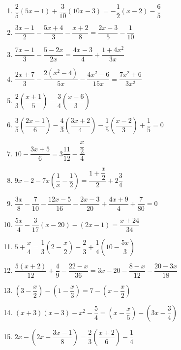 \documentclass{article}
\begin{document}
\begin{enumerate}[label=\bfseries\small 141.\arabic*, itemsep=4cm]
\item $\dfrac{2}{5}(5x-1) + \dfrac{3}{10}(10x-3) = -\dfrac{1}{2}(x-2) - \dfrac{6}{5}$

\item $\dfrac{3x-1}{2} - \dfrac{5x+4}{3} - \dfrac{x+2}{8} = \dfrac{2x-3}{5} - \dfrac{1}{10}$

\item $\dfrac{7x-1}{3} - \dfrac{5-2x}{2x} = \dfrac{4x-3}{4} + \dfrac{1+4x^2}{3x}$

\item $\dfrac{2x+7}{3} - \dfrac{2(x^2-4)}{5x} - \dfrac{4x^2-6}{15x} = \dfrac{7x^2+6}{3x^2}$

\item $\dfrac{2}{3}\left(\dfrac{x+1}{5}\right) = \dfrac{3}{4}\left(\dfrac{x-6}{3}\right)$

\item $\dfrac{3}{5}\left(\dfrac{2x-1}{6}\right) - \dfrac{4}{3}\left(\dfrac{3x+2}{4}\right) - \dfrac{1}{5}\left(\dfrac{x-2}{3}\right) + \dfrac{1}{5} = 0$

\item $10 - \dfrac{3x+5}{6} = 3\dfrac{11}{12} - \dfrac{\dfrac{x}{2}}{4}$

\item $9x - 2 - 7x\left(\dfrac{1}{x}-\dfrac{1}{2}\right) = \dfrac{1+\dfrac{x}{2}}{2} + 2\dfrac{3}{4}$

\item $\dfrac{3x}{8} - \dfrac{7}{10} - \dfrac{12x - 5}{16} - \dfrac{2x - 3}{20} + \dfrac{4x + 9}{4} + \dfrac{7}{80} = 0$

\item $\dfrac{5x}{4} - \dfrac{3}{17}(x - 20) - (2x - 1) = \dfrac{x + 24}{34}$

\item $5 + \dfrac{x}{4} = \dfrac{1}{3} \left( 2 - \dfrac{x}{2} \right) - \dfrac{2}{3} + \dfrac{1}{4} \left( 10 - \dfrac{5x}{3} \right)$

\item $\dfrac{5(x + 2)}{12} + \dfrac{4}{9} - \dfrac{22 - x}{36} = 3x - 20 - \dfrac{8 - x}{12} - \dfrac{20 - 3x}{18}$

\item $\left( 3 - \dfrac{x}{2} \right) - \left( 1 - \dfrac{x}{3} \right) = 7 - \left( x - \dfrac{x}{2} \right)$

\item $(x + 3)(x - 3) - x^2 - \dfrac{5}{4} = \left( x - \dfrac{x}{5} \right) - \left( 3x - \dfrac{3}{4} \right)$

\item $2x - \left( 2x - \dfrac{3x - 1}{8} \right) = \dfrac{2}{3} \left( \dfrac{x + 2}{6} \right) - \dfrac{1}{4}$

\end{enumerate}
\end{document}
